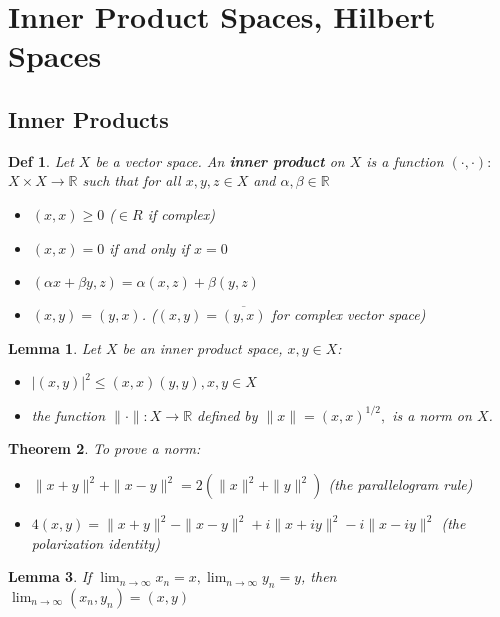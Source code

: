 \documentclass[10pt]{paper}
\newtheorem{theorem}{Theorem}[section]
\newtheorem{definition}{Def}[section]
\newtheorem{lemma}[theorem]{Lemma}
\begin{document}
\section{Inner Product Spaces, Hilbert Spaces}

\subsection{Inner Products}
\begin{definition}
    Let $X$ be a vector space. An \textbf{inner product} on $X$ is a function $(\cdot, \cdot):$ $X \times X \rightarrow \mathbb{R}$ such that for all $x, y, z \in X$ and $\alpha, \beta \in \mathbb{R}$
    \begin{itemize}
        \item $(x, x) \geq 0$ ($\in R$ if complex)
        \item $(x, x)=0$ if and only if $x=0$
        \item $(\alpha x+\beta y, z)=\alpha(x, z)+\beta(y, z)$
        \item $(x, y)=(y, x)$. ($(x, y)=\overline{(y, x)}$ for complex vector space)
    \end{itemize}
\end{definition}

\begin{lemma}
    Let $X$ be an inner product space, $x, y \in X $:
    \begin{itemize}
        \item $|(x, y)|^{2} \leq(x, x)(y, y), x, y \in X$
        \item the function $\|\cdot\|: X \rightarrow \mathbb{R}$ defined by $\|x\|=(x, x)^{1 / 2},$ is a norm on $X$.
    \end{itemize}
\end{lemma}

\begin{theorem}
    To prove a norm:
    \begin{itemize}
        \item $ \|x+y\|^{2}+\|x-y\|^{2}=2\left(\|x\|^{2}+\|y\|^{2}\right) $ (the parallelogram rule)
        \item $4(x, y)=\|x+y\|^{2}-\|x-y\|^{2}+i\|x+i y\|^{2}-i\|x-i y\|^{2}$ (the polarization identity)
    \end{itemize}
\end{theorem}

\begin{lemma}
    If $\lim _{n \rightarrow \infty} x_{n}=x, \lim _{n \rightarrow \infty} y_{n}=y$, then $\lim _{n \rightarrow \infty}\left(x_{n}, y_{n}\right)=(x, y)$
\end{lemma}
\end{document}
